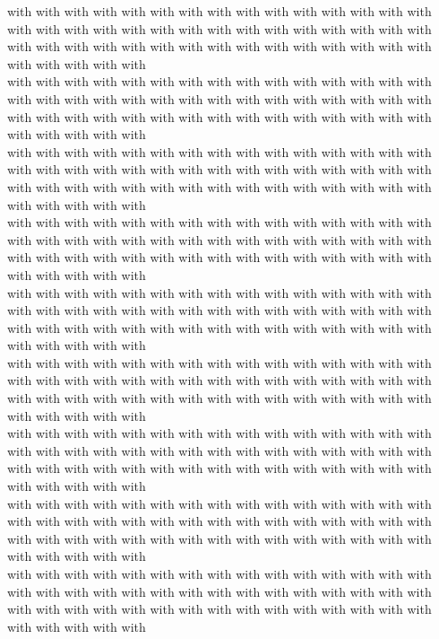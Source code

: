 with with with with with with with with with with with with with with with with with with with with with with with with with with with with with with with with with with with with with with with with with with with with with with with with with with\\
with with with with with with with with with with with with with with with with with with with with with with with with with with with with with with with with with with with with with with with with with with with with with with with with with with\\
with with with with with with with with with with with with with with with with with with with with with with with with with with with with with with with with with with with with with with with with with with with with with with with with with with\\
with with with with with with with with with with with with with with with with with with with with with with with with with with with with with with with with with with with with with with with with with with with with with with with with with with\\
with with with with with with with with with with with with with with with with with with with with with with with with with with with with with with with with with with with with with with with with with with with with with with with with with with\\
with with with with with with with with with with with with with with with with with with with with with with with with with with with with with with with with with with with with with with with with with with with with with with with with with with\\
with with with with with with with with with with with with with with with with with with with with with with with with with with with with with with with with with with with with with with with with with with with with with with with with with with\\
with with with with with with with with with with with with with with with with with with with with with with with with with with with with with with with with with with with with with with with with with with with with with with with with with with\\
with with with with with with with with with with with with with with with with with with with with with with with with with with with with with with with with with with with with with with with with with with with with with with with with with with\\
